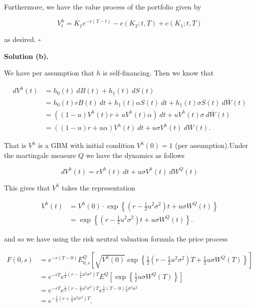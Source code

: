 \documentclass[
]{book}
\begin{document}
Furthermore, we have the value process of the portfolio given by

\[
V^h_t=K_1e^{-r(T-t)}-c(K_2;t,T)+c(K_1;t,T)
\]

as desired. \(\square\)

\noindent\makebox[\linewidth]{\rule{\textwidth}{0.4pt}}

\textbf{Solution (b).}

We have per assumption that \(h\) is self-financing. Then we know that

\begin{align*}
dV^h(t)&=h_0(t)\ dB(t)+h_1(t)\ dS(t)\\
&=h_0(t)rB(t)\ dt+h_1(t)\alpha S(t)\ dt+h_1(t)\sigma S(t)\ d\overline{W}(t)\\
&=\left((1-u)V^h(t) r+uV^h(t)\alpha\right)\ dt+uV^h(t)\sigma\ d\overline{W}(t)\\
&=\left((1-u) r+u\alpha\right)V^h(t)\ dt+u\sigma V^h(t)\ d\overline{W}(t).
\end{align*}

That is \(V^h\) is a GBM with initial condition \(V^h(0)=1\) (per assumption).Under the martingale measure \(Q\) we have the dynamics as follows

\[
dV^h(t)=rV^h(t)\ dt+u\sigma V^h(t)\ dW^Q(t)
\]

This gives that \(V^h\) takes the representation

\begin{align*}
V^h(t)&=V^h(0)\cdot\exp\left\{\left( r-\frac{1}{2}u^2\sigma^2\right)t+u\sigma W^Q(t)\right\}\\
&=\exp\left\{\left( r-\frac{1}{2}u^2\sigma^2\right)t+u\sigma W^Q(t)\right\}.
\end{align*}

and so we have using the risk neutral valuation formula the price process

\begin{align*}
F(0,s)&=e^{-r(T-0)}E^Q_{0,s}\left[\sqrt{V^h(0)}\exp\left\{\frac{1}{2}\left( r-\frac{1}{2}u^2\sigma^2\right)T+\frac{1}{2}u\sigma W^Q(T)\right\}\right]\\
&=e^{-rT}e^{\frac{1}{2}\left( r-\frac{1}{2}u^2\sigma^2\right)T}E^Q\left[\exp\left\{\frac{1}{2}u\sigma W^Q(T)\right\}\right]\\
&=e^{-rT}e^{\frac{1}{2}\left( r-\frac{1}{2}u^2\sigma^2\right)T}e^{\frac{1}{2}(T-0)\frac{1}{4}\sigma^2 u^2}\\
&=e^{-\frac{1}{2}\left( r+\frac{1}{4}u^2\sigma^2\right)T}.
\end{align*}
\end{document}
